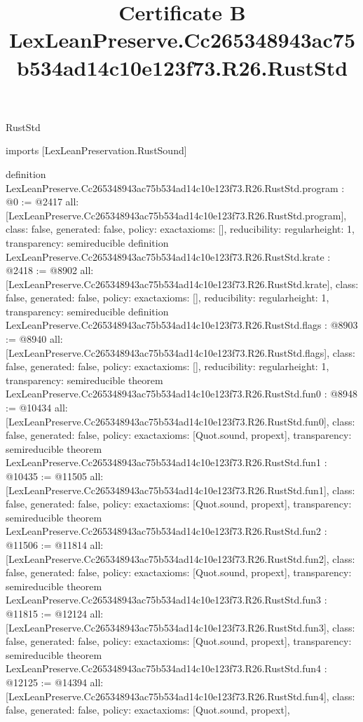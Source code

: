 \begin{lexlean}{RustStd}
\title{Certificate B LexLeanPreserve.Cc265348943ac75b534ad14c10e123f73.R26.RustStd}
\begin{coremodule}
imports [LexLeanPreservation.RustSound]

definition LexLeanPreserve.Cc265348943ac75b534ad14c10e123f73.R26.RustStd.program : @0 := @2417 {
  all: [LexLeanPreserve.Cc265348943ac75b534ad14c10e123f73.R26.RustStd.program],
  class: false,
  generated: false,
  policy: exact{axioms: []},
  reducibility: regular{height: 1},
  transparency: semireducible
}
definition LexLeanPreserve.Cc265348943ac75b534ad14c10e123f73.R26.RustStd.krate : @2418 := @8902 {
  all: [LexLeanPreserve.Cc265348943ac75b534ad14c10e123f73.R26.RustStd.krate],
  class: false,
  generated: false,
  policy: exact{axioms: []},
  reducibility: regular{height: 1},
  transparency: semireducible
}
definition LexLeanPreserve.Cc265348943ac75b534ad14c10e123f73.R26.RustStd.flags : @8903 := @8940 {
  all: [LexLeanPreserve.Cc265348943ac75b534ad14c10e123f73.R26.RustStd.flags],
  class: false,
  generated: false,
  policy: exact{axioms: []},
  reducibility: regular{height: 1},
  transparency: semireducible
}
theorem LexLeanPreserve.Cc265348943ac75b534ad14c10e123f73.R26.RustStd.fun0 : @8948 := @10434 {
  all: [LexLeanPreserve.Cc265348943ac75b534ad14c10e123f73.R26.RustStd.fun0],
  class: false,
  generated: false,
  policy: exact{axioms: [Quot.sound, propext]},
  transparency: semireducible
}
theorem LexLeanPreserve.Cc265348943ac75b534ad14c10e123f73.R26.RustStd.fun1 : @10435 := @11505 {
  all: [LexLeanPreserve.Cc265348943ac75b534ad14c10e123f73.R26.RustStd.fun1],
  class: false,
  generated: false,
  policy: exact{axioms: [Quot.sound, propext]},
  transparency: semireducible
}
theorem LexLeanPreserve.Cc265348943ac75b534ad14c10e123f73.R26.RustStd.fun2 : @11506 := @11814 {
  all: [LexLeanPreserve.Cc265348943ac75b534ad14c10e123f73.R26.RustStd.fun2],
  class: false,
  generated: false,
  policy: exact{axioms: [Quot.sound, propext]},
  transparency: semireducible
}
theorem LexLeanPreserve.Cc265348943ac75b534ad14c10e123f73.R26.RustStd.fun3 : @11815 := @12124 {
  all: [LexLeanPreserve.Cc265348943ac75b534ad14c10e123f73.R26.RustStd.fun3],
  class: false,
  generated: false,
  policy: exact{axioms: [Quot.sound, propext]},
  transparency: semireducible
}
theorem LexLeanPreserve.Cc265348943ac75b534ad14c10e123f73.R26.RustStd.fun4 : @12125 := @14394 {
  all: [LexLeanPreserve.Cc265348943ac75b534ad14c10e123f73.R26.RustStd.fun4],
  class: false,
  generated: false,
  policy: exact{axioms: [Quot.sound, propext]},
}
\end{coremodule}
\end{lexlean}
